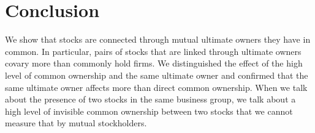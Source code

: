 \section{Conclusion}

	We show that stocks are connected through mutual ultimate owners they have in common. In particular, pairs of stocks that are linked through ultimate owners covary more than commonly hold firms. We distinguished the effect of the high level of common ownership and the same ultimate owner and confirmed that the same ultimate owner affects more than direct common ownership.
	When we talk about the presence of two stocks in the same business group, we talk about a high level of invisible common ownership between two stocks that we cannot measure that by mutual stockholders.
	


\newpage
	{
	\footnotesize
		
		
	}





